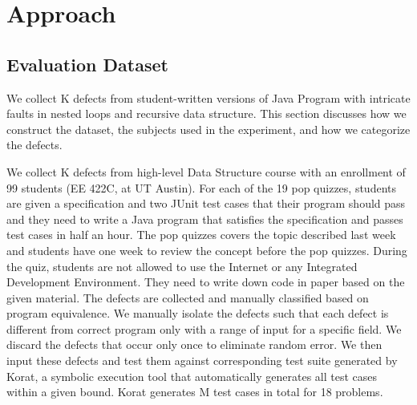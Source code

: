 

%
\section{Approach}




\subsection{Evaluation Dataset} 

We collect K defects from student-written versions of Java Program with intricate faults in nested loops and recursive data structure. This section discusses how we construct the dataset, the subjects used in the experiment, and how we categorize the defects. 


We collect K defects from high-level Data Structure course with an enrollment of 99 students (EE 422C, at UT Austin). For each of the 19 pop quizzes, students are given a specification and two JUnit test cases that their program should pass and they need to write a Java program that satisfies the specification and passes test cases in half an hour.  The pop quizzes covers the topic described last week and students have one week to review the concept before the pop quizzes. During the quiz, students  are not allowed to use the Internet or any Integrated Development Environment. They need to write down code in paper based on the given material. The defects are collected and manually classified based on program equivalence. We manually isolate the defects such that each defect is different from correct program only with a range of input for a specific field. 
 We discard the defects that occur only once to eliminate random error. We then input these defects and test them against corresponding test suite generated by Korat, a symbolic execution tool that automatically generates all test cases within a given bound. Korat generates M test cases in total for 18 problems. 

